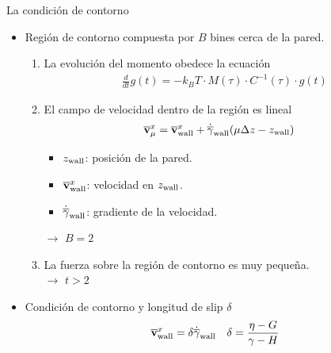 \documentclass{beamer}
\newcommand{\esc}{\!\cdot\!}
\begin{document}
\begin{frame}{La condición de contorno}
  \begin{itemize}
    \item<1-> \alert{Región de contorno} compuesta por $B$ bines cerca de la pared.
  \begin{enumerate}
    \item<2-> La evolución del momento obedece la ecuación
      \begin{align}
        \frac{d}{dt}g(t)=-k_BT\esc M(\tau)\esc C^{-1}(\tau)\esc g(t)
        \nonumber
      \end{align}
\item<3-> El campo de velocidad dentro de la región es lineal 
\begin{align}
\overline{\bf v}^x_{\mu}&=  \overline{\bf v}^x_{\rm wall}+\dot{\overline{\gamma}}_{\rm wall}(\mu\Delta z-z_{\rm wall})
\nonumber
\end{align}
      \begin{itemize}
        \item $z_{\rm wall}$: posición de la pared.
        \item $\overline{\bf v}^x_{\rm wall}$: velocidad en  $z_{\rm wall}$.
        \item $\dot{\overline{\gamma}}_{\rm wall}$: gradiente de la velocidad.
      \end{itemize}
      $\rightarrow$ $B=2$
    \item<4-> La fuerza sobre la región de contorno es muy pequeña. \\
      $\rightarrow$ $t>2$
  \end{enumerate}
\item<5-> Condición de contorno y longitud de slip $\delta$
\begin{align}
\overline{\bf v}^x_{\rm wall}=\delta\dot{\overline{\gamma}}_{\rm wall}
  && \delta=\frac{\eta-G}{\gamma-H}
  \nonumber
\end{align}
  \end{itemize}
\end{frame}
\end{document}
